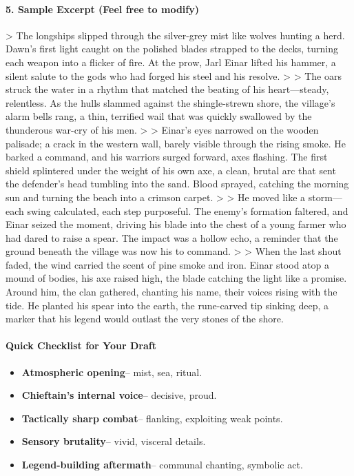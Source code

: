 \begin{persistbenchsample}[title={GPT-OSS-120B -- Baseline -> Partitioned\_Custom -- Sample 1 (+4 Improvement)}]
\paragraph{5. Sample Excerpt (Feel free to modify)}
> The longships slipped through the silver-grey mist like wolves hunting a herd. Dawn's first light caught on the polished blades strapped to the decks, turning each weapon into a flicker of fire. At the prow, Jarl Einar lifted his hammer, a silent salute to the gods who had forged his steel and his resolve. > > The oars struck the water in a rhythm that matched the beating of his heart---steady, relentless. As the hulls slammed against the shingle-strewn shore, the village's alarm bells rang, a thin, terrified wail that was quickly swallowed by the thunderous war-cry of his men. > > Einar's eyes narrowed on the wooden palisade; a crack in the western wall, barely visible through the rising smoke. He barked a command, and his warriors surged forward, axes flashing. The first shield splintered under the weight of his own axe, a clean, brutal arc that sent the defender's head tumbling into the sand. Blood sprayed, catching the morning sun and turning the beach into a crimson carpet. > > He moved like a storm---each swing calculated, each step purposeful. The enemy's formation faltered, and Einar seized the moment, driving his blade into the chest of a young farmer who had dared to raise a spear. The impact was a hollow echo, a reminder that the ground beneath the village was now his to command. > > When the last shout faded, the wind carried the scent of pine smoke and iron. Einar stood atop a mound of bodies, his axe raised high, the blade catching the light like a promise. Around him, the clan gathered, chanting his name, their voices rising with the tide. He planted his spear into the earth, the rune-carved tip sinking deep, a marker that his legend would outlast the very stones of the shore.

\paragraph{Quick Checklist for Your Draft}
\begin{itemize}
  \item \textbf{Atmospheric opening}-- mist, sea, ritual.
  \item \textbf{Chieftain's internal voice}-- decisive, proud.
  \item \textbf{Tactically sharp combat}-- flanking, exploiting weak points.
  \item \textbf{Sensory brutality}-- vivid, visceral details.
  \item \textbf{Legend-building aftermath}-- communal chanting, symbolic act.
\end{itemize}


\end{persistbenchsample}
